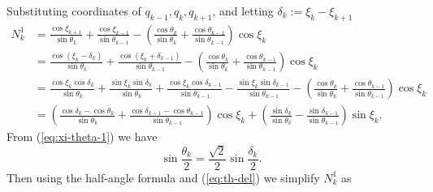 \documentclass[12pt]{article}
\begin{document}
Substituting coordinates of $q_{k-1}, q_k, q_{k+1}$, 
and letting
$\delta_{k}:= \xi_{k}-\xi_{k+1}$
\begin{equation*}
  \begin{split}
N_{k}^1 
& = 
\frac{\cos \xi_{k+1}}{\sin {\theta_{k}}} 
+  \frac{\cos \xi_{k-1}}{\sin {\theta_{k-1}}} 
- \left(
  \frac{\cos \theta_k}{\sin {\theta_{k}}}
+  \frac{\cos \theta_{k-1} }{\sin {\theta_{k-1}}} 
\right)
\cos \xi_{k}\\
&= \frac{\cos (\xi_{k}-\delta_k)}{\sin {\theta_{k}}} 
+  \frac{\cos (\xi_{k}+\delta_{k-1})}{\sin {\theta_{k-1}}} 
- \left(
  \frac{\cos \theta_k}{\sin {\theta_{k}}}
+  \frac{\cos \theta_{k-1} }{\sin {\theta_{k-1}}} 
\right)
\cos \xi_{k}\\
&= \frac{\cos \xi_{k} \cos \delta_k}{\sin {\theta_{k}}} 
+\frac{\sin\xi_{k} \sin\delta_k}{\sin {\theta_{k}}} 
+  \frac{\cos\xi_{k} \cos \delta_{k-1}}{\sin {\theta_{k-1}}} 
-  \frac{\sin\xi_{k} \sin\delta_{k-1}}{\sin {\theta_{k-1}}} 
- \left(
  \frac{\cos \theta_k}{\sin {\theta_{k}}}
+  \frac{\cos \theta_{k-1} }{\sin {\theta_{k-1}}} 
\right)
\cos \xi_{k}\\
&= \left(
\frac{\cos \delta_{k}-\cos \theta_k}{\sin \theta_k}
+ \frac{\cos \delta_{k-1}-\cos \theta_{k-1}}{\sin \theta_{k-1}}
\right) \cos \xi_{k}
+ \left(
  \frac{\sin \delta_{k}}{\sin \theta_k}
- \frac{\sin \delta_{k-1}}{\sin \theta_{k-1}}
\right) \sin \xi_k .
\end{split}
\end{equation*}
From (\ref{eq:xi-theta-1}) we have 
\begin{equation}\label{eq:th-del}
  \sin \frac{\theta_k}{2}= \frac{\sqrt{2}}{2} \sin \frac{\delta_k}{2}.
\end{equation}
Then using the half-angle formula and (\ref{eq:th-del}) we simplify $N_k^1$ as
\end{document}
